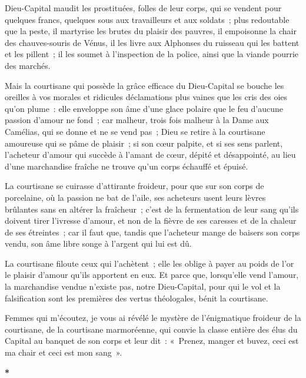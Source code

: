 \documentclass[french,twoside]{book} %
\begin{document}
Dieu-Capital maudit les prostituées, folles de leur corps, qui se vendent pour quelques francs, quelques sous aux travailleurs et aux soldats ; plus redoutable que la peste, il martyrise les brutes du plaisir des pauvres, il empoisonne la chair des chauves-souris de Vénus, il les livre aux Alphonses du ruisseau qui les battent et les pillent ; il les soumet à l’inspection de la police, ainsi que la viande pourrie des marchés.\par
Mais la courtisane qui possède la grâce efficace du Dieu-Capital se bouche les oreilles à vos morales et ridicules déclamations plus vaines que les cris des oies qu’on plume : elle enveloppe son âme d’une glace polaire que le feu d’aucune passion d’amour ne fond ; car malheur, trois fois malheur à la Dame aux Camélias, qui se donne et ne se vend pas ; Dieu se retire à la courtisane amoureuse qui se pâme de plaisir ; si son cœur palpite, et si ses sens parlent, l’acheteur d’amour qui succède à l’amant de cœur, dépité et désappointé, au lieu d’une marchandise fraîche ne trouve qu’un corps échauffé et épuisé.\par
La courtisane se cuirasse d’attirante froideur, pour que sur son corps de porcelaine, où la passion ne bat de l’aile, ses acheteurs usent leurs lèvres brûlantes sans en altérer la fraîcheur ; c’est de la fermentation de leur sang qu’ils doivent tirer l’ivresse d’amour, et non de la fièvre de ses caresses et de la chaleur de ses étreintes ; car il faut que, tandis que l’acheteur mange de baisers son corps vendu, son âme libre songe à l’argent qui lui est dû.\par
La courtisane filoute ceux qui l’achètent ; elle les oblige à payer au poids de l’or le plaisir d’amour qu’ils apportent en eux. Et parce que, lorsqu’elle vend l’amour, la marchandise vendue n’existe pas, notre Dieu-Capital, pour qui le vol et la falsification sont les premières des vertus théologales, bénit la courtisane.\par
Femmes qui m’écoutez, je vous ai révélé le mystère de l’énigmatique froideur de la courtisane, de la courtisane marmoréenne, qui convie la classe entière des élus du Capital au banquet de son corps et leur dit : « Prenez, manger et buvez, ceci est ma chair et ceci est mon sang ».\par

\begin{center}
\noindent \textbf{*}\par
\end{center}
\end{document}
